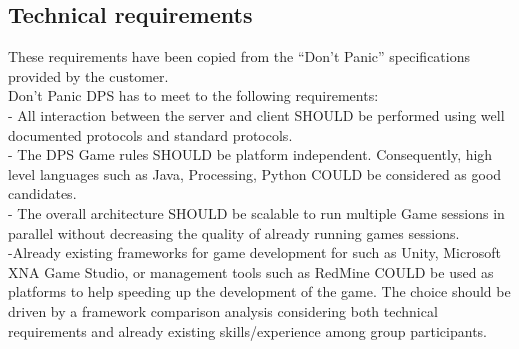 \subsection{Technical requirements}
These requirements have been copied from the “Don’t Panic” specifications 
provided by the customer.\\

Don’t Panic DPS has to meet to the following requirements:\\
- All interaction between the server and client SHOULD be performed using well 
documented protocols and standard protocols.\\
- The DPS Game rules SHOULD be platform independent. Consequently, high level 
languages such as Java, Processing, Python COULD be considered as good 
candidates.\\
- The overall architecture SHOULD be scalable to run multiple Game sessions in 
parallel without decreasing the quality of already running games sessions.\\
-Already existing frameworks for game development for such as Unity, Microsoft 
XNA Game Studio, or management tools such as RedMine COULD be used as platforms 
to help speeding up the development of the game. The choice should be driven by 
a framework comparison analysis considering both technical requirements and 
already existing skills/experience among group participants.






